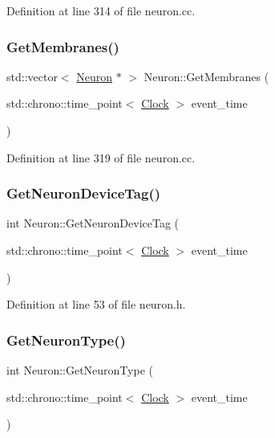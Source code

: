 Definition at line 314 of file neuron.\+cc.

\mbox{\label{class_neuron_ac759d9589c0505332e8238cafbc8fa66}} 
\subsubsection{\texorpdfstring{Get\+Membranes()}{GetMembranes()}}
{\footnotesize\ttfamily std\+::vector$<$ \mbox{\hyperlink{class_neuron}{Neuron}} $\ast$ $>$ Neuron\+::\+Get\+Membranes (\begin{DoxyParamCaption}\item[{std\+::chrono\+::time\+\_\+point$<$ \mbox{\hyperlink{universe_8h_a0ef8d951d1ca5ab3cfaf7ab4c7a6fd80}{Clock}} $>$}]{event\+\_\+time }\end{DoxyParamCaption})}



Definition at line 319 of file neuron.\+cc.

\mbox{\label{class_neuron_aff3a33f5d8ef5dacdec9c03df50f168c}} 
\subsubsection{\texorpdfstring{Get\+Neuron\+Device\+Tag()}{GetNeuronDeviceTag()}}
{\footnotesize\ttfamily int Neuron\+::\+Get\+Neuron\+Device\+Tag (\begin{DoxyParamCaption}\item[{std\+::chrono\+::time\+\_\+point$<$ \mbox{\hyperlink{universe_8h_a0ef8d951d1ca5ab3cfaf7ab4c7a6fd80}{Clock}} $>$}]{event\+\_\+time }\end{DoxyParamCaption})\hspace{0.3cm}{\ttfamily [inline]}}



Definition at line 53 of file neuron.\+h.

\mbox{\label{class_neuron_a98f326ea86e6e8371b639609a4495c37}} 
\subsubsection{\texorpdfstring{Get\+Neuron\+Type()}{GetNeuronType()}}
{\footnotesize\ttfamily int Neuron\+::\+Get\+Neuron\+Type (\begin{DoxyParamCaption}\item[{std\+::chrono\+::time\+\_\+point$<$ \mbox{\hyperlink{universe_8h_a0ef8d951d1ca5ab3cfaf7ab4c7a6fd80}{Clock}} $>$}]{event\+\_\+time }\end{DoxyParamCaption})\hspace{0.3cm}{\ttfamily [inline]}}



